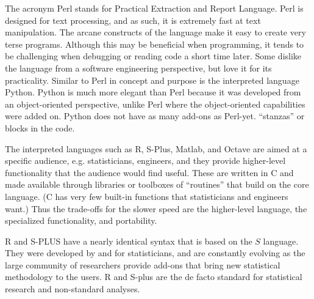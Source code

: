 The acronym Perl stands for Practical Extraction and Report Language.
Perl is designed for text processing, and as such, it is extremely
fast at text manipulation.  The arcane constructs of the language make
it easy to create very terse programs. Although this may be beneficial
when programming, it tends to be challenging when debugging or reading
code a short time later.  Some dislike the language from a software
engineering perspective, but love it for its practicality.  Similar to
Perl in concept and purpose is the interpreted language Python.
Python is much more elegant than Perl because it was developed from an
object-oriented perspective, unlike Perl where the object-oriented
capabilities were added on. Python does not have as many add-ons as
Perl-yet.
``stanzas'' or blocks in the code.

The interpreted languages such as R, S-Plus, Matlab, and Octave are
aimed at a specific audience, e.g. statisticians, engineers, and they
provide higher-level functionality that the audience would find
useful. These are written in C and made available through libraries or
toolboxes of ``routines'' that build on the core language.  (C has
very few built-in functions that statisticians and engineers want.)
Thus the trade-offs for the slower speed are the higher-level
language, the specialized functionality, and portability.

R and S-PLUS have a nearly identical syntax that is
based on the $S$ language.  They were developed by and for
statisticians, and are constantly evolving as the large community of
researchers provide add-ons that bring new statistical methodology to
the users.  R and S-plus are the de facto standard for statistical
research and non-standard analyses.

